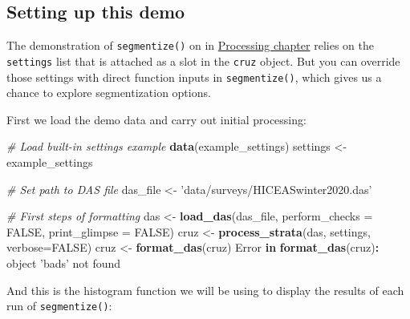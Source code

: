 \documentclass[
]{book}
\newenvironment{Shaded}{\begin{snugshade}}{\end{snugshade}}
\newcommand{\CommentTok}[1]{\textcolor[rgb]{0.56,0.35,0.01}{\textit{#1}}}
\newcommand{\ControlFlowTok}[1]{\textcolor[rgb]{0.13,0.29,0.53}{\textbf{#1}}}
\newcommand{\DataTypeTok}[1]{\textcolor[rgb]{0.13,0.29,0.53}{#1}}
\newcommand{\KeywordTok}[1]{\textcolor[rgb]{0.13,0.29,0.53}{\textbf{#1}}}
\newcommand{\NormalTok}[1]{#1}
\newcommand{\OperatorTok}[1]{\textcolor[rgb]{0.81,0.36,0.00}{\textbf{#1}}}
\newcommand{\OtherTok}[1]{\textcolor[rgb]{0.56,0.35,0.01}{#1}}
\newcommand{\StringTok}[1]{\textcolor[rgb]{0.31,0.60,0.02}{#1}}
\begin{document}
\hypertarget{setting-up-this-demo}{%
\subsection*{Setting up this demo}\label{setting-up-this-demo}}

The demonstration of \texttt{segmentize()} on in \protect\hyperlink{processing}{Processing chapter} relies on the \texttt{settings} list that is attached as a slot in the \texttt{cruz} object. But you can override those settings with direct function inputs in \texttt{segmentize()}, which gives us a chance to explore segmentization options.

First we load the demo data and carry out initial processing:

\begin{Shaded}
\begin{Highlighting}[]
\CommentTok{# Load built-in settings example}
\KeywordTok{data}\NormalTok{(example_settings)}
\NormalTok{settings <-}\StringTok{ }\NormalTok{example_settings}

\CommentTok{# Set path to DAS file}
\NormalTok{das_file <-}\StringTok{ 'data/surveys/HICEASwinter2020.das'}

\CommentTok{# First steps of formatting}
\NormalTok{das <-}\StringTok{ }\KeywordTok{load_das}\NormalTok{(das_file, }
                \DataTypeTok{perform_checks =} \OtherTok{FALSE}\NormalTok{,}
                \DataTypeTok{print_glimpse =} \OtherTok{FALSE}\NormalTok{)}
\NormalTok{cruz <-}\StringTok{ }\KeywordTok{process_strata}\NormalTok{(das,}
\NormalTok{                       settings,}
                       \DataTypeTok{verbose=}\OtherTok{FALSE}\NormalTok{)}
\NormalTok{cruz <-}\StringTok{ }\KeywordTok{format_das}\NormalTok{(cruz)}
\NormalTok{Error }\ControlFlowTok{in} \KeywordTok{format_das}\NormalTok{(cruz)}\OperatorTok{:}\StringTok{ }\NormalTok{object }\StringTok{'bads'}\NormalTok{ not found}
\end{Highlighting}
\end{Shaded}

And this is the histogram function we will be using to display the results of each run of \texttt{segmentize()}:
\end{document}

